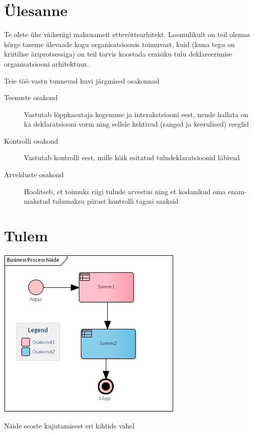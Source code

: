 \documentclass[nobib]{tufte-handout}
\begin{document}
\section{Ülesanne}
Te olete ühe väikeriigi maksuameit ettevõttearhitekt. Loomulikult on teil olemas kõrge taseme ülevaade kogu organisatsioonis toimuvast, kuid (kuna tegu on kriitilise äriprotsessiga) on teil tarvis koostada eraisiku tulu deklareerimise organisatsiooni arhitektuur. 

Teie töö vastu tunnevad huvi järgmised osakonnad
\begin{description}
	\item[Teenuste osakond] Vastutab lõppkasutaja kogemuse ja interakstsiooni eest, nende hallata on ka deklaratsiooni vorm ning sellele kehtivad (ranged ja keerulised) reeglid
	\item[Kontrolli osakond] Vastutab kontrolli eest, mille kõik esitatud tuludeklaratsioonid läbivad
	\item[Arvelduste osakond] Hoolitseb, et toimuks riigi tulude arvestus ning et kodanikud oma enam-makstud tulumaksu pärast kontrolli tagasi saaksid
\end{description}

\section{Tulem}
\begin{marginfigure}%
  \includegraphics[width=\linewidth]{bpmn.png}
  \caption{Näide seoste kujutamisest eri kihtide vahel}
  \label{fig:bpmn}
\end{marginfigure}
\end{document}
